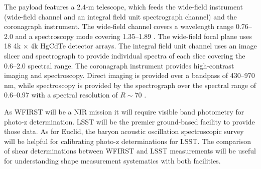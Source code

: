 The payload features a 2.4-m telescope, which feeds the wide-field instrument (wide-field channel and an integral field unit spectrograph channel) and the coronagraph instrument. The wide-field channel covers a wavelength range 0.76--2.0 \um and a spectroscopy mode covering 1.35--1.89 \um. The wide-field focal plane uses 18 4k $\times$ 4k HgCdTe detector arrays. The integral field unit channel uses an image slicer and spectrograph to provide individual spectra of each slice covering the 0.6--2.0 \um spectral range. The coronagraph instrument provides high-contrast imaging and spectroscopy. Direct imaging is provided over a bandpass of 430--970 nm, while spectroscopy is provided by the spectrograph over the spectral range of 0.6--0.97 \um with a spectral resolution of $R\sim70$ \cite{WFIRST_report}.

As WFIRST will be a NIR mission it will require visible band photometry for photo-z determination. LSST will be the premier ground-based facility to provide those data. As for Euclid, the baryon acoustic oscillation spectroscopic survey will be helpful for calibrating photo-z determinations for LSST. The comparison of shear determinations between WFIRST and LSST measurements will be useful for understanding shape measurement systematics with both facilities.